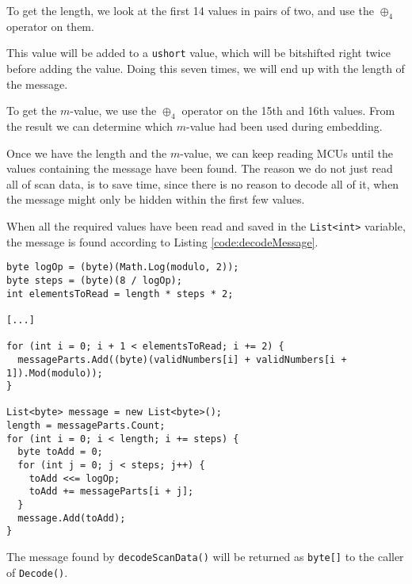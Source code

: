 To get the length, we look at the first 14 values in pairs of two, and use the $\oplus_4$ operator on them.

This value will be added to a \lstinline|ushort| value, which will be bitshifted right twice before adding the value. 
Doing this seven times, we will end up with the length of the message.

To get the $m$-value, we use the $\oplus_4$ operator on the 15th and 16th values.
From the result we can determine which $m$-value had been used during embedding.

Once we have the length and the $m$-value, we can keep reading MCUs until the values containing the message have been found. 
The reason we do not just read all of scan data, is to save time, since there is no reason to decode all of it, when the message might only be hidden within the first few values.

When all the required values have been read and saved in the \lstinline|List<int>| variable, the message is found according to Listing \ref{code:decodeMessage}.

\begin{lstlisting}[firstnumber=158, label={code:decodeMessage}, caption={Decodes the message encoded into the JPEG image using the graph-theoretic method \textbf{File: }JPEGDecoder.cs}]
byte logOp = (byte)(Math.Log(modulo, 2));
byte steps = (byte)(8 / logOp);
int elementsToRead = length * steps * 2;

[...]

for (int i = 0; i + 1 < elementsToRead; i += 2) {
  messageParts.Add((byte)(validNumbers[i] + validNumbers[i + 1]).Mod(modulo));
}

List<byte> message = new List<byte>();
length = messageParts.Count;
for (int i = 0; i < length; i += steps) {
  byte toAdd = 0;
  for (int j = 0; j < steps; j++) {
    toAdd <<= logOp;
    toAdd += messageParts[i + j];
  }
  message.Add(toAdd);
}
\end{lstlisting}

The message found by \lstinline|decodeScanData()| will be returned as \lstinline|byte[]| to the caller of \lstinline|Decode()|.
